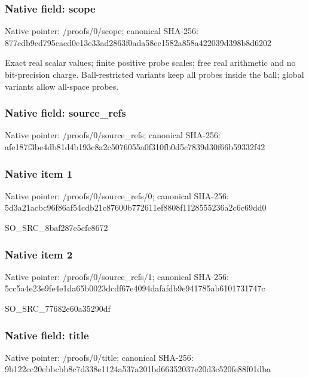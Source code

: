 \documentclass[10pt,a4paper]{article}
\begin{document}
\subsubsection{Native field: scope}
Native pointer: /proofs/0/scope; canonical SHA-256: 877cdb9cd795caed0e13c33ad2863f0ada58ec1582a858a422039d398b8d6202

\begingroup\raggedright\sloppy Exact real scalar values;\allowbreak{} finite positive probe scales;\allowbreak{} free real arithmetic and no bit-precision charge. Ball-restricted variants keep all probes inside the ball;\allowbreak{} global variants allow all-space probes.\par\endgroup

\subsubsection{Native field: source\_\allowbreak{}refs}
Native pointer: /proofs/0/source\_\allowbreak{}refs; canonical SHA-256: afe187f3be4db81d4b193c8a2c5076055a0f310fb0d5c7839d30f66b59332f42

\subsubsection{Native item 1}
Native pointer: /proofs/0/source\_\allowbreak{}refs/0; canonical SHA-256: 5d3a21acbc96f86af54cdb21c87600b772611ef8808f1128555236a2c6c69dd0

\begingroup\raggedright\sloppy SO\_\allowbreak{}SRC\_\allowbreak{}8baf287e5cfc8672\par\endgroup

\subsubsection{Native item 2}
Native pointer: /proofs/0/source\_\allowbreak{}refs/1; canonical SHA-256: 5cc5a4e23e9fe4e1da65b0023dcdf67e4094dafafdb9e941785ab6101731747c

\begingroup\raggedright\sloppy SO\_\allowbreak{}SRC\_\allowbreak{}77682e60a35290df\par\endgroup

\subsubsection{Native field: title}
Native pointer: /proofs/0/title; canonical SHA-256: 9b122cc20ebbcbb8c7d338e1124a537a201bd66352037e20d3c520fe88f01dba
\end{document}
